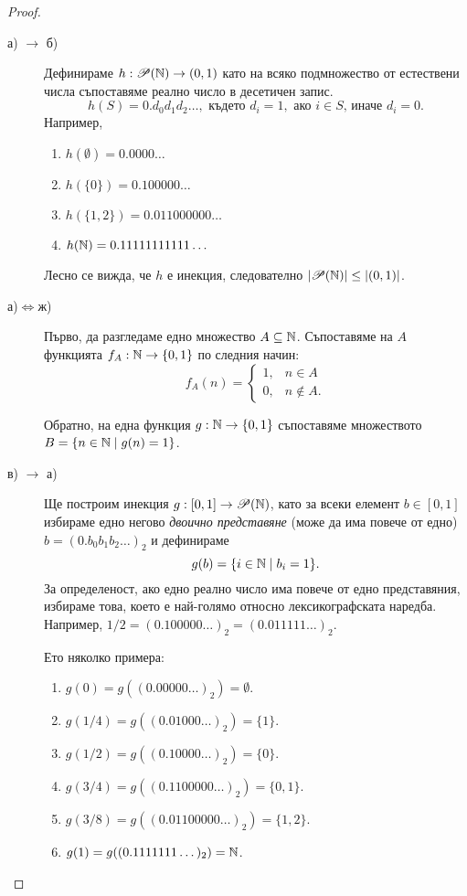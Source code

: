\begin{proof}
  \begin{description}
  \item[а) $\rightarrow$ б)]
    Дефинираме $h:\mathscr{P}(\mathbb{N})\to (0,1)$ като на всяко подмножество от естествени числа съпоставяме реално число в десетичен запис.
    \[h(S) = 0.d_0d_1d_2\dots,\mbox{ където } d_i = 1,\mbox{ ако }i\in S\mbox{, иначе } d_i = 0.\]
    Например,
    \begin{enumerate}[]
    \item
      $h(\emptyset) = 0.0000\dots$
    \item
      $h(\{0\}) = 0.100000\dots$
    \item
      $h(\{1,2\}) = 0.011000000\dots$
    \item
      $h(\mathbb{N}) = 0.11111111111\dots$
    \end{enumerate}
    Лесно се вижда, че $h$ е инекция, следователно $|\mathscr{P}(\mathbb{N})|\leq|(0,1)|$.
  \item[а)$\iff$ж)]
    Първо, да разгледаме едно множество $A \subseteq \mathbb{N}$.
    Съпоставяме на $A$ функцията $f_A:\mathbb{N} \to \{0,1\}$  по следния начин:
    \[
    f_A(n) = 
    \begin{cases}
      1, & n \in A\\
      0, & n\not\in A.
    \end{cases}
    \]

    Обратно, на една функция $g:\mathbb{N}\to\{0,1\}$ съпоставяме множеството $B = \{n \in \mathbb{N} \mid g(n) = 1\}$.
  \item[в) $\rightarrow$ а)]
    Ще построим инекция $g:[0,1]\to\mathscr{P}(\mathbb{N})$, като
    за всеки елемент $b\in[0,1]$ избираме едно негово {\em двоично представяне} (може да има повече от едно)
    $b = (0.b_0b_1b_2\dots)_2$ и дефинираме \[g(b) = \{i\in\mathbb{N}\mid b_i = 1\}.\]
    За определеност, ако едно реално число има повече от едно представяния, избираме това, което е най-голямо относно лексикографската наредба.
    Например, $1/2 = (0.100000\dots)_2 = (0.011111\dots)_2$.

    Ето няколко примера:
    \begin{enumerate}[]
    \item
      $g(0) = g((0.00000\dots)_2) = \emptyset$.
    \item
      $g(1/4) = g((0.01000\dots)_2) = \{1\}$.
    \item
      $g(1/2) = g((0.10000\dots)_2) = \{0\}$.
    \item
      $g(3/4) = g((0.1100000\dots)_2) = \{0,1\}$.
    \item
      $g(3/8) = g((0.01100000\dots)_2) = \{1,2\}$.
    \item
      $g(1) = g((0.1111111\dots)_2) = \mathbb{N}$.
    \end{enumerate}
    

\end{description}
\end{proof}
